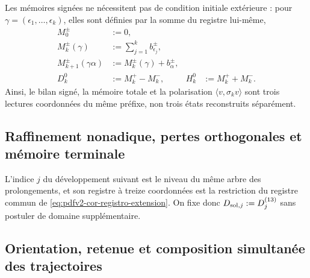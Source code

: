 Les mémoires signées ne nécessitent pas de condition initiale extérieure : pour \(\gamma=(\epsilon_1,\ldots,\epsilon_k)\), elles sont définies par la somme du registre lui-même,
\begin{equation}
\label{eq:pdfv2-cor-memorias}
 \begin{aligned}
 M_0^\pm&:=0,\\
 M_k^\pm(\gamma)&:=\sum_{j=1}^k b_{\epsilon_j}^\pm,\\
 M_{k+1}^\pm(\gamma\alpha)&:=M_k^\pm(\gamma)+b_\alpha^\pm,\\
 D_k^0&:=M_k^+-M_k^-, &
 H_k^0&:=M_k^++M_k^-.
 \end{aligned}
\end{equation}
Ainsi, le bilan signé, la mémoire totale et la polarisation \(\langle v,\sigma_kv\rangle\) sont trois lectures coordonnées du même préfixe, non trois états reconstruits séparément.

\subsection{Raffinement nonadique, pertes orthogonales et mémoire terminale}
L'indice \(j\) du développement suivant est le niveau du même arbre des prolongements, et son registre à treize coordonnées est la restriction du registre commun de \eqref{eq:pdfv2-cor-registro-extension}. On fixe donc \(D_{{\rm sol},j}:=D_j^{(13)}\) sans postuler de domaine supplémentaire.
\begingroup
\let\section\subsection

\endgroup

\section{Orientation, retenue et composition simultanée des trajectoires}

